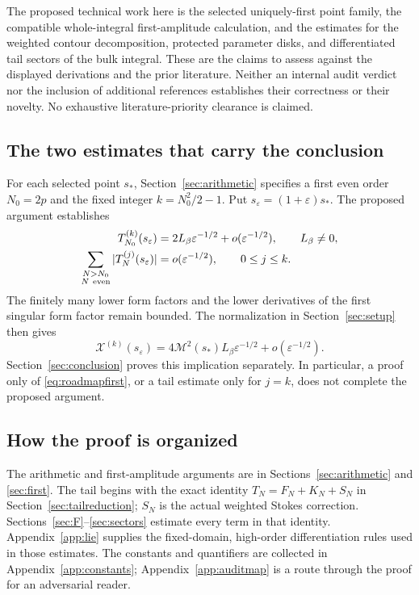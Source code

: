 \documentclass[11pt]{article}
\numberwithin{equation}{section}
\theoremstyle{definition}
\newcommand{\eps}{\varepsilon}
\newcommand{\M}{\mathcal M}
\begin{document}
The proposed technical work here is the selected uniquely-first point
family, the compatible whole-integral first-amplitude calculation,
and the estimates for the weighted contour decomposition, protected
parameter disks, and differentiated tail sectors of the bulk integral.
These are the claims to assess against the displayed derivations and
the prior literature. Neither an internal audit verdict nor the
inclusion of additional references establishes their correctness or
their novelty. No exhaustive literature-priority clearance is claimed.

\subsection{The two estimates that carry the conclusion}
For each selected point \(s_*\), Section~\ref{sec:arithmetic} specifies
a first even order \(N_0=2p\) and the fixed integer
\(k=N_0^2/2-1\). Put \(s_\eps=(1+\eps)s_*\). The proposed argument
establishes
\begin{align}
 T_{N_0}^{(k)}(s_\eps)
   &=2L_\beta\eps^{-1/2}+o(\eps^{-1/2}),\qquad L_\beta\ne0,
       \label{eq:roadmapfirst}\\
 \sum_{\substack{N>N_0\\N\ {\rm even}}}
       |T_N^{(j)}(s_\eps)|
   &=o(\eps^{-1/2}),\qquad 0\le j\le k .
       \label{eq:roadmaptail}
\end{align}
The finitely many lower form factors and the lower derivatives of the
first singular form factor remain bounded. The normalization in
Section~\ref{sec:setup} then gives
\[
 \mathcal X^{(k)}(s_\eps)
   =4\M^2(s_*)L_\beta\eps^{-1/2}+o(\eps^{-1/2}).
\]
Section~\ref{sec:conclusion} proves this implication separately.
In particular, a proof only of \eqref{eq:roadmapfirst}, or a tail
estimate only for \(j=k\), does not complete the proposed argument.

\subsection{How the proof is organized}
The arithmetic and first-amplitude arguments are in
Sections~\ref{sec:arithmetic} and \ref{sec:first}. The tail begins
with the exact identity \(T_N=F_N+K_N+S_N\) in
Section~\ref{sec:tailreduction}; \(S_N\) is the actual weighted
Stokes correction. Sections~\ref{sec:F}--\ref{sec:sectors} estimate
every term in that identity. Appendix~\ref{app:lie} supplies the
fixed-domain, high-order differentiation rules used in those estimates.
The constants and quantifiers are collected in
Appendix~\ref{app:constants}; Appendix~\ref{app:auditmap} is a route
through the proof for an adversarial reader.
\end{document}
